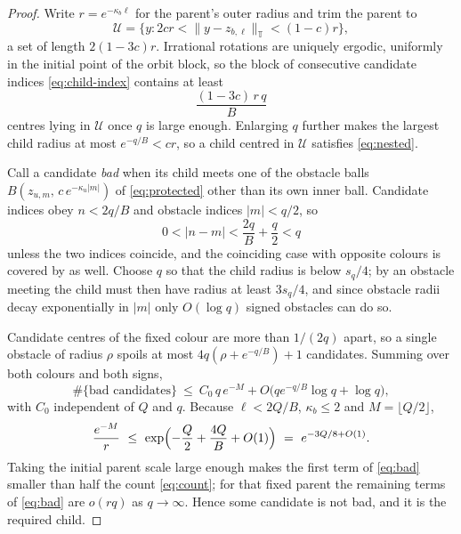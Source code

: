 \documentclass[11pt,reqno]{amsart}
\theoremstyle{plain}
\theoremstyle{definition}
\theoremstyle{remark}
\numberwithin{equation}{section}
\begin{document}
\begin{proof}
  Write $r=e^{-\kappa_b\ell}$ for the parent's outer radius and trim the
  parent to
  \begin{equation}
    \label{eq:trimmed}
    \mathcal U=\bigl\{y:2cr<\lVert y-z_{b,\ell}\rVert_{\mathbb T}<(1-c)r\bigr\},
  \end{equation}
  a set of length $2(1-3c)r$. Irrational rotations are uniquely ergodic,
  uniformly in the initial point of the orbit block, so the block of
  consecutive candidate indices \eqref{eq:child-index} contains at least
  \begin{equation}
    \label{eq:count}
    \frac{(1-3c)\,r\,q}{B}
  \end{equation}
  centres lying in $\mathcal U$ once $q$ is large enough. Enlarging $q$
  further makes the largest child radius at most $e^{-q/B}<cr$, so a child
  centred in $\mathcal U$ satisfies \eqref{eq:nested}.

  Call a candidate \emph{bad} when its child meets one of the obstacle balls
  $B(z_{u,m},\,c\,e^{-\kappa_u|m|})$ of \eqref{eq:protected} other than its
  own inner ball. Candidate indices obey $n<2q/B$ and obstacle indices
  $|m|<q/2$, so
  \begin{equation}
    \label{eq:index-gap}
    0<|n-m|<\frac{2q}{B}+\frac q2<q
  \end{equation}
  unless the two indices coincide, and the coinciding case with opposite
  colours is covered by  as well. Choose $q$ so that the
  child radius is below $s_q/4$; by  an obstacle meeting
  the child must then have radius at least $3s_q/4$, and since obstacle radii
  decay exponentially in $|m|$ only $O(\log q)$ signed obstacles can do so.

  Candidate centres of the fixed colour are more than $1/(2q)$ apart, so a
  single obstacle of radius $\rho$ spoils at most $4q(\rho+e^{-q/B})+1$
  candidates. Summing over both colours and both signs,
  \begin{equation}
    \label{eq:bad}
    \#\{\text{bad candidates}\}
    \ \le\ C_0\,q\,e^{-M}+O\bigl(q e^{-q/B}\log q+\log q\bigr),
  \end{equation}
  with $C_0$ independent of $Q$ and $q$. Because $\ell<2Q/B$, $\kappa_b\le2$
  and $M=\lfloor Q/2\rfloor$,
  \begin{equation}
    \label{eq:ratio}
    \frac{e^{-M}}{r}
    \ \le\ \exp\Bigl(-\frac Q2+\frac{4Q}{B}+O(1)\Bigr)
    \ =\ e^{-3Q/8+O(1)} .
  \end{equation}
  Taking the initial parent scale large enough makes the first term of
  \eqref{eq:bad} smaller than half the count \eqref{eq:count}; for that fixed
  parent the remaining terms of \eqref{eq:bad} are $o(rq)$ as $q\to\infty$.
  Hence some candidate is not bad, and it is the required child.
\end{proof}
\end{document}
